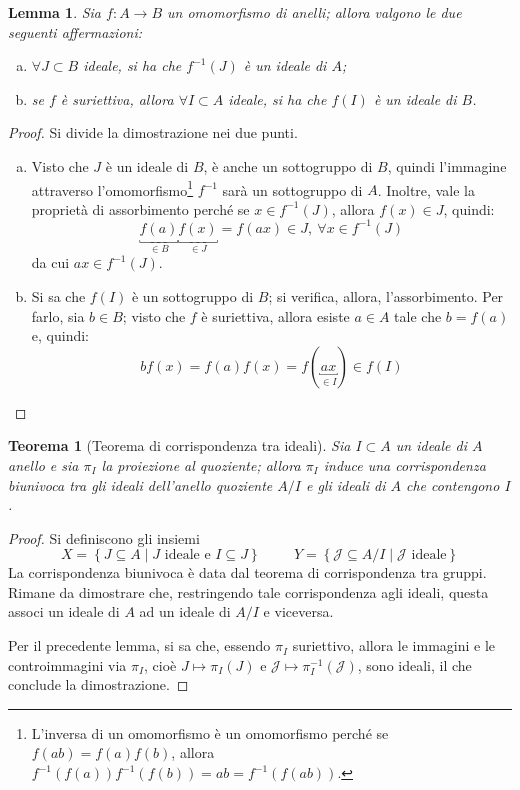 \documentclass[12pt]{scrartcl}
\theoremstyle{style}
\newtheorem{teorema}{Teorema}[section]
\newtheorem{lemma}{Lemma}[teorema]
\numberwithin{equation}{subsection}
\begin{document}
\begin{lemma}
	Sia $f: A\to B$ un omomorfismo di anelli; allora valgono le due seguenti affermazioni:
\begin{enumerate}[(a).]
	\item $\forall J \subset B$ ideale, si ha che $f^{-1}(J)$ \`e un ideale di $A$;
	\item se $f$ \`e suriettiva, allora $\forall I \subset A$ ideale, si ha che $f(I)$ \`e un ideale di $B$.
\end{enumerate}
\end{lemma}
		\begin{proof}
			Si divide la dimostrazione nei due punti.
			\begin{enumerate}[(a).]
				\item Visto che $J$ \`e un ideale di $B$, \`e anche un sottogruppo di $B$, quindi l'immagine attraverso l'omomorfismo\footnote{L'inversa di un omomorfismo \`e un omomorfismo perch\'e se $f(ab) = f(a)f(b)$, allora $f^{-1}(f(a)) f^{-1}(f(b)) =ab= f^{-1}(f(ab))$.} $f^{-1}$ sar\`a un sottogruppo di $A$.
					Inoltre, vale la propriet\`a di assorbimento perch\'e se $x \in f^{-1}(J)$, allora $f(x) \in J$, quindi:
					\[
						\underbracket{f(a)}_{\in B} \underbracket{f(x)}_{\in J}  = f(ax) \in J, \ \forall x \in f^{-1}(J)
					\] 
					da cui $ax \in f^{-1}(J)$.
				\item Si sa che $f(I)$ \`e un sottogruppo di $B$; si verifica, allora, l'assorbimento. 
					Per farlo, sia $b \in B$; visto che $f$ \`e suriettiva, allora esiste $a \in A $ tale che $b = f(a)$ e, quindi:
					\[
						b f(x) = f(a) f(x) = f(\underbracket{ax}_{\in I} ) \in f(I)
					\] 
			\end{enumerate}
		\end{proof}
\begin{teorema}
	[Teorema di corrispondenza tra ideali]
	Sia $I \subset A$ un ideale di $A$ anello e sia $\pi_I$ la proiezione al quoziente; allora $\pi_I$ induce una corrispondenza biunivoca tra gli ideali dell'anello quoziente $A / I$ e gli ideali di $A$ che contengono $I$.
\end{teorema}
	\begin{proof}
		Si definiscono gli insiemi 
		\[
		X = \left\{ J \subseteq A  \mid J \text{ ideale e } I \subseteq J\right\} \hspace{1cm}Y = \left\{ \mathcal{J} \subseteq A / I  \mid \mathcal{J} \text{ ideale} \right\} 
		\] 
		La corrispondenza biunivoca \`e data dal teorema di corrispondenza tra gruppi. 
		Rimane da dimostrare che, restringendo tale corrispondenza agli ideali, questa associ un ideale di $A$ ad un ideale di $A / I$ e viceversa.

		Per il precedente lemma, si sa che, essendo $\pi_I$ suriettivo, allora le immagini e le controimmagini via $\pi_I$, cio\`e $J \longmapsto \pi_I (J)$ e $ \mathcal{J} \longmapsto \pi^{-1}_I(\mathcal{J} )$, sono ideali, il che conclude la dimostrazione.
	\end{proof}
\end{document}
